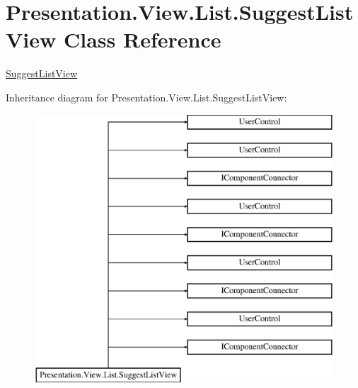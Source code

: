 \hypertarget{class_presentation_1_1_view_1_1_list_1_1_suggest_list_view}{}\section{Presentation.\+View.\+List.\+Suggest\+List\+View Class Reference}
\label{class_presentation_1_1_view_1_1_list_1_1_suggest_list_view}


\hyperlink{class_presentation_1_1_view_1_1_list_1_1_suggest_list_view}{Suggest\+List\+View}  


Inheritance diagram for Presentation.\+View.\+List.\+Suggest\+List\+View\+:\begin{figure}[H]
\begin{center}
\leavevmode
\includegraphics[height=10.000000cm]{class_presentation_1_1_view_1_1_list_1_1_suggest_list_view}
\end{center}
\end{figure}
